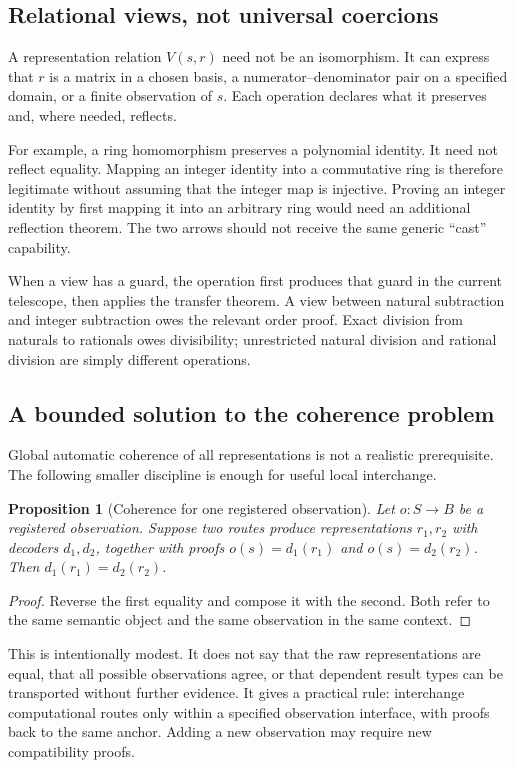 \documentclass[11pt,letterpaper]{article}
\newtheorem{proposition}{Proposition}[section]
\theoremstyle{definition}
\begin{document}
\subsection{Relational views, not universal coercions}
A representation relation \(V(s,r)\) need not be an isomorphism. It can express that
\(r\) is a matrix in a chosen basis, a numerator--denominator pair on a specified
domain, or a finite observation of \(s\). Each operation declares what it preserves
and, where needed, reflects.

For example, a ring homomorphism preserves a polynomial identity. It need not
reflect equality. Mapping an integer identity into a commutative ring is therefore
legitimate without assuming that the integer map is injective. Proving an integer
identity by first mapping it into an arbitrary ring would need an additional
reflection theorem. The two arrows should not receive the same generic ``cast''
capability.

When a view has a guard, the operation first produces that guard in the current
telescope, then applies the transfer theorem. A view between natural subtraction
and integer subtraction owes the relevant order proof. Exact division from
naturals to rationals owes divisibility; unrestricted natural division and rational
division are simply different operations.

\subsection{A bounded solution to the coherence problem}
Global automatic coherence of all representations is not a realistic prerequisite.
The following smaller discipline is enough for useful local interchange.

\begin{proposition}[Coherence for one registered observation]
Let \(o:S\to B\) be a registered observation. Suppose two routes produce
representations \(r_1,r_2\) with decoders \(d_1,d_2\), together with proofs
\(o(s)=d_1(r_1)\) and \(o(s)=d_2(r_2)\). Then
\(d_1(r_1)=d_2(r_2)\).
\end{proposition}
\begin{proof}
Reverse the first equality and compose it with the second. Both refer to the same
semantic object and the same observation in the same context.
\end{proof}

This is intentionally modest. It does not say that the raw representations are
equal, that all possible observations agree, or that dependent result types can
be transported without further evidence. It gives a practical rule: interchange
computational routes only within a specified observation interface, with proofs
back to the same anchor. Adding a new observation may require new compatibility
proofs.
\end{document}
